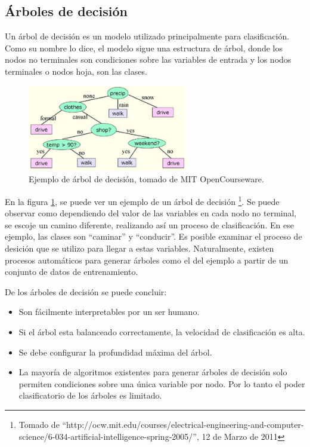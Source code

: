 \documentclass[a4paper, 11pt, oneside]{report}
\begin{document}
\subsection{Árboles de decisión}

Un árbol de decisión es un modelo utilizado principalmente para clasificación. Como su nombre lo dice, el modelo sigue una estructura de árbol, donde los nodos no terminales son condiciones sobre las variables de entrada y los nodos terminales o nodos hoja, son las clases.

\begin{figure}[htb]
\begin{center}
\leavevmode
\includegraphics[width=7cm]{img/decisiontree.jpg}
\end{center}
\caption{Ejemplo de árbol de decisión, tomado de MIT OpenCourseware.}
\label{fig:decisionTree}
\end{figure}

En la figura \ref{fig:decisionTree}, se puede ver un ejemplo de un árbol de decisión \footnote{Tomado de ``http://ocw.mit.edu/courses/electrical-engineering-and-computer-science/6-034-artificial-intelligence-spring-2005/'', 12 de Marzo de 2011}. Se puede observar como dependiendo del valor de las variables en cada nodo no terminal, se 
escoje un camino diferente, realizando así un proceso de clasificación. En ese ejemplo, las clases son ``caminar'' y ``conducir''. Es posible examinar el proceso de desición
que se utilizo para llegar a estas variables. Naturalmente, existen procesos automáticos para generar árboles como el del ejemplo a partir de un conjunto de datos de entrenamiento.

De los árboles de decisión se puede concluir:

\begin{itemize}
	\item Son fácilmente interpretables por un ser humano.
	\item Si el árbol esta balanceado correctamente, la velocidad de clasificación es alta.
	\item Se debe configurar la profundidad máxima del árbol.
	\item La mayoría de algoritmos existentes para generar árboles de decisión solo permiten condiciones sobre una única variable por nodo. Por lo tanto el poder clasificatorio de los árboles es limitado.
\end{itemize}
\end{document}
